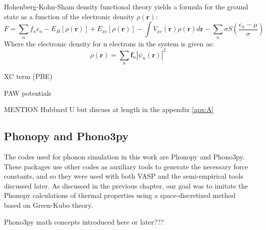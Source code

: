 Hohenberg-Kohn-Sham density functional theory yields a formula for the ground state as a function of the electronic density $\rho(\boldsymbol{r})$:
\begin{equation}\label{HKS-functional}
    F = \sum_n f_n \epsilon_n - E_H[\rho(\boldsymbol{r})] + E_{xc}[\rho(\boldsymbol{r})] - \int V_{xc}(\boldsymbol{r}) \rho(\boldsymbol{r}) d\boldsymbol{r} - \sum_n \sigma S \left(\frac{\epsilon_n-\mu}{\sigma}\right)
\end{equation}
Where the electronic density for n electrons in the system is given as:
\begin{equation}\label{HKS-electron-density}
    \rho (\boldsymbol{r})=\sum_n \boldsymbol{f}_n |\psi_n(\boldsymbol{r})|^2
\end{equation}
\autocite{kresseEfficiencyAbinitioTotal1996}

XC term (PBE)
\autocite{perdewGeneralizedGradientApproximation1996} %

PAW potentials
\autocite{kresseUltrasoftPseudopotentialsProjector1999} %

MENTION Hubbard U but discuss at length in the appendix \ref{apx:A}
\autocite{anisimovBandTheoryMott1991} %
\autocite{teschHubbardParametersTransition2022} %


\subsection{Phonopy and Phono3py}

The codes used for phonon simulation in this work are Phonopy and Phono3py. These packages use other codes as auxiliary tools to generate the necessary force constants, and so they were used with both VASP and the semi-empirical tools discussed later. As discussed in the previous chapter, our goal was to imitate the Phonopy calculations of thermal properties using a space-discretized method based on Green-Kubo theory.
 
\autocite{ashcroftSolidStatePhysics1976} %
\autocite{togoFirstprinciplesPhononCalculations2023} %
Phono3py math concepts introduced here or later???
\autocite{togoDistributionsPhononLifetimes2015} %


